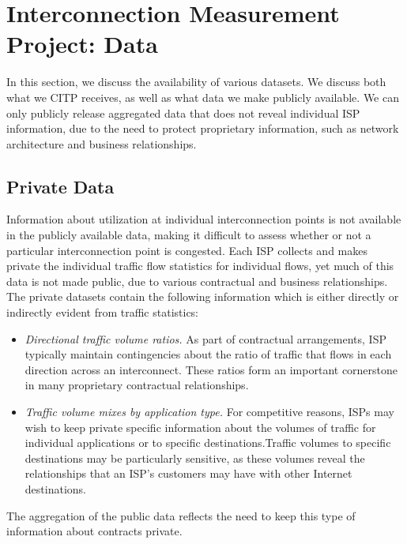 \section{Interconnection Measurement Project: Data}\label{sec:data}

In this section, we discuss the availability of various datasets. We
discuss both what we CITP receives, as well as what data we make
publicly available. We can only publicly release aggregated data that
does not reveal individual ISP information, due to the need to protect
proprietary information, such as network architecture and business
relationships.



\subsection{Private Data}

Information about utilization at individual interconnection points is
not available in the publicly available data, making it difficult to
assess whether or not a particular interconnection point is
congested. Each ISP collects and makes private the individual traffic
flow statistics for individual flows, yet much of this data is not made
public, due to various contractual and business relationships. The
private datasets contain the following information which is either
directly or indirectly evident from traffic statistics: 
\begin{itemize}
\item	{\em Directional traffic volume ratios.} As part of contractual
  arrangements, ISP typically maintain contingencies about the ratio of
  traffic that flows in each direction across an interconnect. These
  ratios form an important cornerstone in many proprietary contractual
  relationships. 
\item {\em Traffic volume mixes by application type.} For competitive
  reasons, ISPs may wish to keep private specific information about the
  volumes of traffic for individual applications or to specific
  destinations.Traffic volumes to specific destinations may be
  particularly sensitive, as these volumes reveal the relationships that
  an ISP’s customers may have with other Internet destinations.
\end{itemize}

The aggregation of the public data reflects the need to keep this type
of information about contracts private. 
\fi
